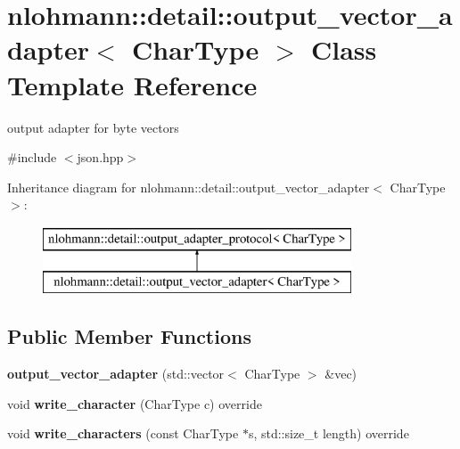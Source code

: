 \hypertarget{classnlohmann_1_1detail_1_1output__vector__adapter}{}\section{nlohmann\+:\+:detail\+:\+:output\+\_\+vector\+\_\+adapter$<$ Char\+Type $>$ Class Template Reference}
\label{classnlohmann_1_1detail_1_1output__vector__adapter}


output adapter for byte vectors  




{\ttfamily \#include $<$json.\+hpp$>$}

Inheritance diagram for nlohmann\+:\+:detail\+:\+:output\+\_\+vector\+\_\+adapter$<$ Char\+Type $>$\+:\begin{figure}[H]
\begin{center}
\leavevmode
\includegraphics[height=2.000000cm]{d5/d66/classnlohmann_1_1detail_1_1output__vector__adapter}
\end{center}
\end{figure}
\subsection*{Public Member Functions}
\begin{DoxyCompactItemize}
\item 
\mbox{\label{classnlohmann_1_1detail_1_1output__vector__adapter_abc6695e8c0274afad31bd581c8acf24f}} 
{\bfseries output\+\_\+vector\+\_\+adapter} (std\+::vector$<$ Char\+Type $>$ \&vec)
\item 
\mbox{\label{classnlohmann_1_1detail_1_1output__vector__adapter_af6a22d4210bb7bc2da66021300ddd6db}} 
void {\bfseries write\+\_\+character} (Char\+Type c) override
\item 
\mbox{\label{classnlohmann_1_1detail_1_1output__vector__adapter_ad6f6c461dec7bedd5359454dc22fc9aa}} 
void {\bfseries write\+\_\+characters} (const Char\+Type $\ast$s, std\+::size\+\_\+t length) override
\end{DoxyCompactItemize}


